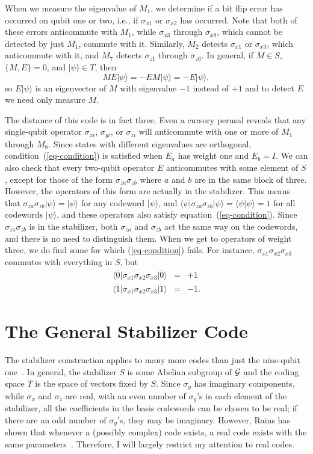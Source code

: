 \documentclass{report}
\newcommand{\G}{{\cal G}}
\newcommand{\ket}[1]{|{#1}\rangle}
\newcommand{\bra}[1]{\langle{#1}|}
\newcommand{\X}{\sigma_x}
\newcommand{\Z}{\sigma_z}
\newcommand{\Y}{\sigma_y}
\newcommand{\Xs}[1]{\sigma_{x{#1}}}
\newcommand{\Ys}[1]{\sigma_{y{#1}}}
\newcommand{\Zs}[1]{\sigma_{z{#1}}}
\begin{document}
When we measure the eigenvalue of $M_1$, we determine if a bit flip 
error has occurred on qubit one or two, i.e., if $\Xs{1}$ or $\Xs{2}$ has 
occurred.  Note that both of these errors anticommute with $M_1$, while 
$\Xs{3}$ through $\Xs{9}$, which cannot be detected by just $M_1$, commute 
with it.  Similarly, $M_2$ detects $\Xs{1}$ or $\Xs{3}$, which anticommute 
with it, and $M_7$ detects $\Zs{1}$ through $\Zs{6}$.  In general, if 
$M \in S$, $\{M, E\} = 0$, and $\ket{\psi} \in T$, then
\begin{equation}
M E \ket{\psi} = - E M \ket{\psi} = - E \ket{\psi},
\end{equation}
so $E \ket{\psi}$ is an eigenvector of $M$ with eigenvalue $-1$ instead of 
$+1$ and to detect $E$ we need only measure $M$.

The distance of this code is in fact three.  Even a cursory perusal reveals 
that any single-qubit operator $\Xs{i}$, $\Ys{i}$, or $\Zs{i}$ will anticommute 
with one or more of $M_1$ through $M_8$.  Since states with different 
eigenvalues are orthogonal, condition~(\ref{eq-condition}) is satisfied when 
$E_a$ has weight one and $E_b = I$.  We can also check that every two-qubit 
operator $E$ anticommutes with some element of $S$, except for those of 
the form $\Zs{a} \Zs{b}$ where $a$ and $b$ are in the same block of three.  
However, the operators of this form are actually in the stabilizer.  This means 
that $\Zs{a} \Zs{b} \ket{\psi} = \ket{\psi}$ for any codeword $\ket{\psi}$, and 
$\bra{\psi} \Zs{a} \Zs{b} \ket{\psi} = \langle \psi \ket{\psi} = 1$ for all 
codewords $\ket{\psi}$, and these operators also satisfy 
equation~(\ref{eq-condition}).  Since $\Zs{a} \Zs{b}$ is in the stabilizer,
both $\Zs{a}$ and $\Zs{b}$ act the same way on the codewords, and there is no 
need to distinguish them.  When we get to operators of weight three, we do 
find some for which (\ref{eq-condition}) fails.  For instance, $\Xs{1} \Xs{2} 
\Xs{3}$ commutes with everything in $S$, but
\begin{eqnarray}
\bra{\overline{0}} \Xs{1} \Xs{2} \Xs{3} \ket{\overline{0}} & = & +1 \\
\bra{\overline{1}} \Xs{1} \Xs{2} \Xs{3} \ket{\overline{1}} & = & -1.
\end{eqnarray}

\section{The General Stabilizer Code}

The stabilizer construction applies to many more codes than just the 
nine-qubit one~\cite{gottesman-stab,calderbank-stab}.  In general, the 
stabilizer $S$ is some Abelian subgroup of $\G$ and the coding space $T$ is 
the space of vectors fixed by $S$.  Since $\Y$ has imaginary components, 
while $\X$ and $\Z$ are real, with an even number of $\Y$'s in each element
of the stabilizer, all the coefficients in the basis codewords can be chosen
to be real; if there are an odd number of $\Y$'s, they may be imaginary.  
However, Rains has shown that whenever a (possibly complex) code exists, a 
real code exists with the same parameters~\cite{rains-shadow}.  Therefore, I 
will largely restrict my attention to real codes.
\end{document}
